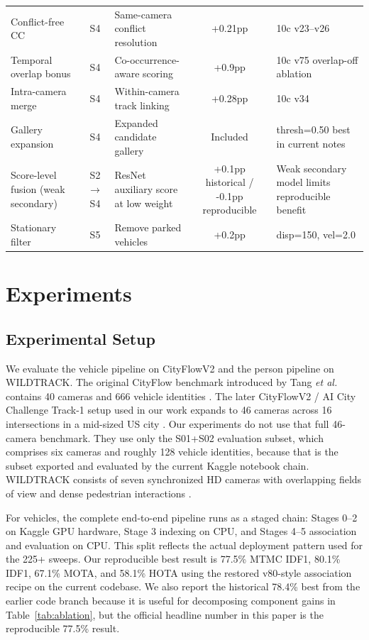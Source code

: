 \documentclass{ieeeaccess}
\begin{document}
\begin{table}[t]
\begin{tabularx}{\textwidth}{l c l c l}
Conflict-free CC & S4 & Same-camera conflict resolution & +0.21pp & 10c v23--v26 \\

Temporal overlap bonus & S4 & Co-occurrence-aware scoring & +0.9pp & 10c v75 overlap-off ablation \\

Intra-camera merge & S4 & Within-camera track linking & +0.28pp & 10c v34 \\

Gallery expansion & S4 & Expanded candidate gallery & Included & thresh=0.50 best in current notes \\

Score-level fusion (weak secondary) & S2$\rightarrow$S4 & ResNet auxiliary score at low weight & +0.1pp historical / -0.1pp reproducible & Weak secondary model limits reproducible benefit \\

Stationary filter & S5 & Remove parked vehicles & +0.2pp & disp=150, vel=2.0 \\
\bottomrule
\end{tabularx}
\endgroup
\end{table}

\section{Experiments}
\subsection{Experimental Setup}
We evaluate the vehicle pipeline on CityFlowV2 and the person pipeline on WILDTRACK. The original CityFlow benchmark introduced by Tang \emph{et al.} contains 40 cameras and 666 vehicle identities \cite{cityflow}. The later CityFlowV2 / AI City Challenge Track-1 setup used in our work expands to 46 cameras across 16 intersections in a mid-sized US city \cite{aicity2022}. Our experiments do not use that full 46-camera benchmark. They use only the S01+S02 evaluation subset, which comprises six cameras and roughly 128 vehicle identities, because that is the subset exported and evaluated by the current Kaggle notebook chain. WILDTRACK consists of seven synchronized HD cameras with overlapping fields of view and dense pedestrian interactions \cite{wildtrack}.

For vehicles, the complete end-to-end pipeline runs as a staged chain: Stages 0--2 on Kaggle GPU hardware, Stage 3 indexing on CPU, and Stages 4--5 association and evaluation on CPU. This split reflects the actual deployment pattern used for the 225+ sweeps. Our reproducible best result is 77.5\% MTMC IDF1, 80.1\% IDF1, 67.1\% MOTA, and 58.1\% HOTA using the restored v80-style association recipe on the current codebase. We also report the historical 78.4\% best from the earlier code branch because it is useful for decomposing component gains in Table~\ref{tab:ablation}, but the official headline number in this paper is the reproducible 77.5\% result.
\end{document}

